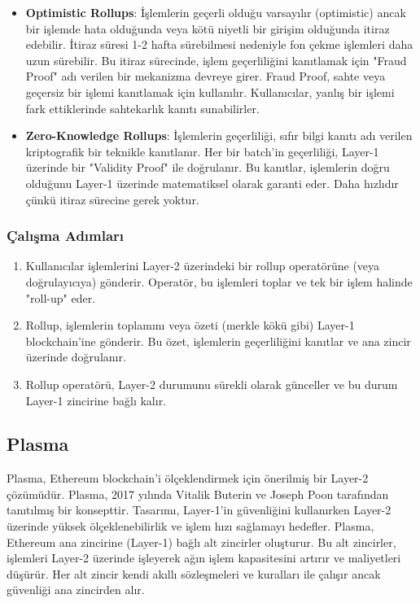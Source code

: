 \begin{itemize}
    \item \textbf{Optimistic Rollups}: İşlemlerin geçerli olduğu varsayılır (optimistic) ancak bir işlemde hata olduğunda veya kötü niyetli bir girişim olduğunda itiraz edebilir. İtiraz süresi 1-2 hafta sürebilmesi nedeniyle fon çekme işlemleri daha uzun sürebilir. Bu itiraz sürecinde, işlem geçerliliğini kanıtlamak için "Fraud Proof" adı verilen bir mekanizma devreye girer. Fraud Proof, sahte veya geçersiz bir işlemi kanıtlamak için kullanılır. Kullanıcılar, yanlış bir işlemi fark ettiklerinde sahtekarlık kanıtı sunabilirler. 
    \item \textbf{Zero-Knowledge Rollups}: İşlemlerin geçerliliği, sıfır bilgi kanıtı adı verilen kriptografik bir teknikle kanıtlanır. Her bir batch'in geçerliliği, Layer-1 üzerinde bir "Validity Proof" ile doğrulanır. Bu kanıtlar, işlemlerin doğru olduğunu Layer-1 üzerinde matematiksel olarak garanti eder. Daha hızlıdır çünkü itiraz sürecine gerek yoktur. 
\end{itemize}

\subsubsection{Çalışma Adımları}

\begin{enumerate}
    \item Kullanıcılar işlemlerini Layer-2 üzerindeki bir rollup operatörüne (veya doğrulayıcıya) gönderir. Operatör, bu işlemleri toplar ve tek bir işlem halinde "roll-up" eder.
    \item Rollup, işlemlerin toplamını veya özeti (merkle kökü gibi) Layer-1 blockchain'ine gönderir. Bu özet, işlemlerin geçerliliğini kanıtlar ve ana zincir üzerinde doğrulanır.
    \item Rollup operatörü, Layer-2 durumunu sürekli olarak günceller ve bu durum Layer-1 zincirine bağlı kalır.
\end{enumerate}

\subsection{Plasma}

Plasma, Ethereum blockchain’i ölçeklendirmek için önerilmiş bir Layer-2 çözümüdür. Plasma, 2017 yılında Vitalik Buterin ve Joseph Poon tarafından tanıtılmış bir konsepttir. Tasarımı, Layer-1’in güvenliğini kullanırken Layer-2 üzerinde yüksek ölçeklenebilirlik ve işlem hızı sağlamayı hedefler. Plasma, Ethereum ana zincirine (Layer-1) bağlı alt zincirler oluşturur. Bu alt zincirler, işlemleri Layer-2 üzerinde işleyerek ağın işlem kapasitesini artırır ve maliyetleri düşürür. Her alt zincir kendi akıllı sözleşmeleri ve kuralları ile çalışır ancak güvenliği ana zincirden alır.

